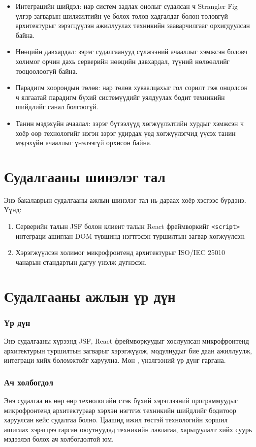 \begin{itemize}
\item Интеграцийн шийдэл: \cite{mannisto2023, pavlenko2020} нар систем задлах онолыг судалсан ч Strangler Fig үлгэр загварын шилжилтийн үе болох төлөв хадгалдаг болон төлөвгүй  архитектурыг зэрэгцүүлэн ажиллуулах техникийн зааварчилгааг орхигдуулсан байна.
\item Нөөцийн давхардал: \cite{ameer2024, taibi2022} зэрэг судалгаанууд сүлжээний ачааллыг хэмжсэн боловч холимог орчин дахь серверийн нөөцийн давхардал, түүний нөлөөллийг тооцоолоогүй байна.
\item Парадигм хоорондын төлөв: \cite{silva2024, mohammed2022} нар төлөв хуваалцахыг гол сорилт гэж онцолсон ч ялгаатай парадигм бүхий системүүдийг уялдуулах бодит техникийн шийдлийг санал болгоогүй.
\item Танин мэдэхүйн ачаалал: \cite{bjelotomic2024, tilak2020} зэрэг бүтээлүүд хөгжүүлэлтийн хурдыг хэмжсэн ч хоёр өөр технологийг нэгэн зэрэг удирдах үед хөгжүүлэгчид үүсэх танин мэдэхүйн ачааллыг үнэлээгүй орхисон байна.
\end{itemize}

\section{Судалгааны шинэлэг тал}
Энэ бакалаврын судалгааны ажлын шинэлэг тал нь дараах хоёр хэсгээс бүрдэнэ. Үүнд:
\begin{enumerate}
    \item Серверийн талын JSF болон клиент талын React фреймворкийг \texttt{<script>} интеграци ашиглан DOM түвшинд нэгтгэсэн туршилтын загвар хөгжүүлсэн.
    \item Хэрэгжүүлсэн холимог микрофронтенд архитектурыг ISO/IEC 25010 чанарын стандартын дагуу үнэлж дүгнэсэн.
\end{enumerate}
\section{Судалгааны ажлын үр дүн}
\subsubsection{Үр дүн}
\hspace*{0.6cm}Энэ судалгааны хүрээнд JSF, React фреймворкуудыг хослуулсан микрофронтенд архитектурын туршилтын загварыг хэрэгжүүлж, модулиудыг бие даан ажиллуулж, интеграци хийх боломжтойг харуулна. Мөн , үнэлгээний үр дүнг гаргана.
\subsubsection{Ач холбогдол}
\hspace*{0.6cm}Энэ судалгаа нь өөр өөр технологийн стэк бүхий хэрэглээний программуудыг микрофронтенд архитектураар хэрхэн нэгтгэх техникийн шийдлийг бодитоор харуулсан кейс судалгаа болно. Цаашид ижил төстэй технологийн хоршил ашиглах хэрэгцээ гарсан оюутнуудад техникийн лавлагаа, харьцуулалт хийх суурь мэдээлэл болох ач холбогдолтой юм.

